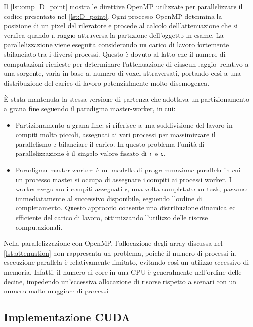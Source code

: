 \documentclass[12pt,a4paper]{report}
\begin{document}
Il \autoref{lst:omp_D_point} mostra le direttive OpenMP utilizzate per parallelizzare il codice presentato nel
\autoref{lst:D_point}.
Ogni processo OpenMP determina la posizione di un pixel del rilevatore e procede al calcolo dell'attenuazione che si verifica
quando il raggio attraversa la partizione dell'oggetto in esame.
La parallelizzazione viene eseguita considerando un carico di lavoro fortemente sbilanciato tra i diversi processi.
Questo è dovuto al fatto che il numero di computazioni richieste per determinare l'attenuazione di ciascun raggio, relativo a una
sorgente, varia in base al numero di voxel attraversati, portando così a una distribuzione del carico di lavoro potenzialmente
molto disomogenea.

È stata mantenuta la stessa versione di partenza che adottava un partizionamento a grana fine seguendo il paradigma master-worker,
in cui:
\begin{itemize}
  \item Partizionamento a grana fine: si riferisce a una suddivisione del lavoro in compiti molto piccoli, assegnati ai vari
        processi per massimizzare il parallelismo e bilanciare il carico.
        In questo problema l'unità di parallelizzazione è il singolo valore fissato di \lstinline{r} e \mbox{\lstinline{c}.}
  \item Paradigma master-worker: è un modello di programmazione parallela in cui un processo master si occupa di assegnare i
        compiti ai processi worker.
        I worker eseguono i compiti assegnati e, una volta completato un task, passano immediatamente al successivo disponibile,
        seguendo l'ordine di completamento.
        Questo approccio consente una distribuzione dinamica ed efficiente del carico di lavoro, ottimizzando l'utilizzo delle
        risorse computazionali.
\end{itemize}

Nella parallelizzazione con OpenMP, l'allocazione degli array discussa nel \autoref{lst:attenuation} non rappresenta un problema,
poiché il numero di processi in esecuzione parallela è relativamente limitato, evitando così un utilizzo eccessivo di memoria.
Infatti, il numero di core in una CPU è generalmente nell'ordine delle decine, impedendo un'eccessiva allocazione di risorse
rispetto a scenari con un numero molto maggiore di processi.

\subsection{Implementazione CUDA}
\end{document}
